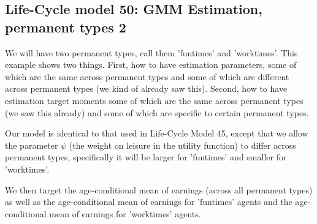 \subsection{Life-Cycle model 50: GMM Estimation, permanent types 2}
We will have two permanent types, call them 'funtimes' and 'worktimes'. This example shows two things. First, how to have estimation parameters, some of which are the same across permanent types and some of which are different across permanent types (we kind of already saw this). Second, how to have estimation target moments some of which are the same across permanent types (we saw this already) and some of which are specific to certain permanent types.

Our model is identical to that used in Life-Cycle Model 45, except that we allow the parameter $\psi$ (the weight on leisure in the utility function) to differ across permanent types, specifically it will be larger for 'funtimes' and smaller for 'worktimes'.

We then target the age-conditional mean of earnings (across all permanent types) as well as the age-conditional mean of earnings for 'funtimes' agents and the age-conditional mean of earnings for 'worktimes' agents.




